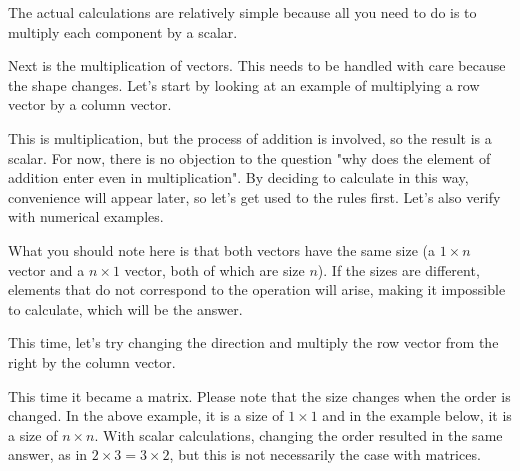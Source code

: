 \documentclass{ltjsbook}
\begin{document}
The actual calculations are relatively simple because all you need to do is to multiply each component by a scalar.




Next is the multiplication of vectors. This needs to be handled with care because the shape changes. Let's start by looking at an example of multiplying a row vector by a column vector.




This is multiplication, but the process of addition is involved, so the result is a scalar. For now, there is no objection to the question "why does the element of addition enter even in multiplication". By deciding to calculate in this way, convenience will appear later, so let's get used to the rules first. Let's also verify with numerical examples.



What you should note here is that both vectors have the same size (a $1 \times n$ vector and a $n \times 1$ vector, both of which are size $n$). If the sizes are different, elements that do not correspond to the operation will arise, making it impossible to calculate, which will be the answer.

This time, let's try changing the direction and multiply the row vector from the right by the column vector.




This time it became a matrix. Please note that the size changes when the order is changed. In the above example, it is a size of $1\times 1$ and in the example below, it is a size of $n \times n$. With scalar calculations, changing the order resulted in the same answer, as in $2 \times 3 = 3 \times 2$, but this is not necessarily the case with matrices.
\end{document}
